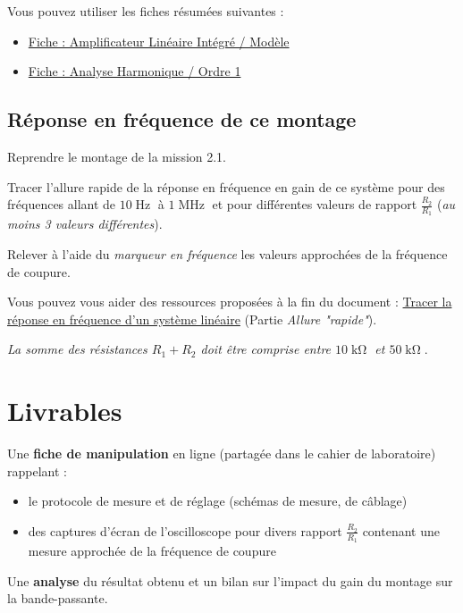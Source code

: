 Vous pouvez utiliser les fiches résumées suivantes : 

\begin{itemize}
	\item \hyperref[fiche:ALIModele]{Fiche : Amplificateur Linéaire Intégré / Modèle}
	\item \hyperref[fiche:AnHaOrdre1]{Fiche : Analyse Harmonique / Ordre 1}
\end{itemize}


\subsection{Réponse en fréquence de ce montage}

\Manip Reprendre le montage de la mission 2.1.

\Manip Tracer l'allure rapide de la réponse en fréquence en gain de ce système pour des fréquences allant de $10\operatorname{Hz}$ à $1\operatorname{MHz}$ et pour différentes valeurs de rapport $\frac{R_2}{R_1}$ (\textit{au moins 3 valeurs différentes}).

\Manip Relever à l'aide du \textit{marqueur en fréquence} les valeurs approchées de la fréquence de coupure.

Vous pouvez vous aider des ressources proposées à la fin du document : \hyperref[ressource:RepFreq]{Tracer la réponse en fréquence d'un système linéaire} (Partie \textit{Allure "rapide"}).
\medskip

\textit{La somme des résistances $R_1 + R_2$ doit être comprise entre $10\operatorname{k\Omega}$ et $50\operatorname{k\Omega}$}.

\section{Livrables}


Une \textbf{fiche de manipulation} en ligne (partagée dans le cahier de laboratoire) rappelant :

\begin{itemize}
	\item le protocole de mesure et de réglage (schémas de mesure, de câblage)
	\item des captures d'écran de l'oscilloscope pour divers rapport $\frac{R_2}{R_1}$ contenant une mesure approchée de la fréquence de coupure
\end{itemize}

Une \textbf{analyse} du résultat obtenu et un bilan sur l'impact du gain du montage sur la bande-passante.


